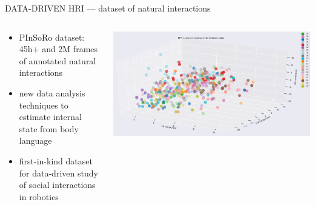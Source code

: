 \documentclass[xcolor=table]{beamer}
\begin{document}
{\begin{frame}{DATA-DRIVEN HRI --- dataset of natural interactions}
\begin{columns}
\begin{column}{0.5\linewidth}
        \end{column}
    \end{columns}
    \vspace{0.5cm}
\begin{columns}
    \begin{column}{0.5\linewidth}
        {\scriptsize
        \begin{itemize}
            \item PInSoRo dataset: 45h+ and 2M frames of annotated natural interactions
            \item new data analysis techniques to estimate internal state from body language
            \item first-in-kind dataset for data-driven study of social
                interactions in robotics
        \end{itemize}
        }
    \end{column}
    \begin{column}{0.5\linewidth}
            \includegraphics[trim=1cm 0 4cm 0,clip,width=\columnwidth]{kinematics_social_dynamics/efa-embeddings.png}
    \end{column}
\end{columns}

\end{frame}
}
\end{document}
